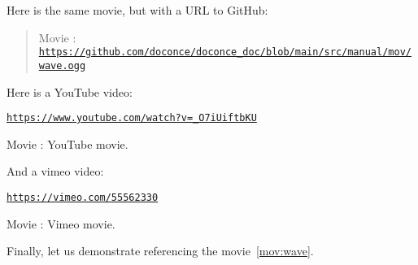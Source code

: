 \documentclass[%
oneside,                 %
final,                   %
10pt]{article}
\newenvironment{doconce:movie}{}{}
\newcounter{doconce:movie:counter}
\begin{document}
Here is the same movie, but with a URL to GitHub:


\begin{doconce:movie}
\begin{quote}
Movie :  \href{https://github.com/doconce/doconce_doc/blob/main/src/manual/mov/wave.ogg}{\nolinkurl{https://github.com/doconce/doconce_doc/blob/main/src/manual/mov/wave.ogg}}
\end{quote}
\end{doconce:movie}


Here is a YouTube video:


\begin{doconce:movie}
\begin{center}
\href{{https://www.youtube.com/watch?v=_O7iUiftbKU}}{\nolinkurl{https://www.youtube.com/watch?v=_O7iUiftbKU}}
\end{center}

\begin{center}  %
Movie : YouTube movie.
\end{center}
\end{doconce:movie}


And a vimeo video:


\begin{doconce:movie}
\begin{center}\href{{https://vimeo.com/55562330}}{\nolinkurl{https://vimeo.com/55562330}}\end{center}

\begin{center}  %
Movie : Vimeo movie.
\end{center}
\end{doconce:movie}


Finally, let us demonstrate referencing the movie~\ref{mov:wave}.


\end{document}
